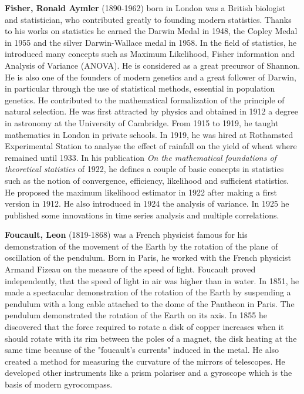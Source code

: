 \textbf{Fisher, Ronald Aymler} (1890-1962) born in London was a British biologist and statistician, who contributed greatly to founding modern statistics. Thanks to his works on statistics he earned the Darwin Medal in 1948, the Copley Medal in 1955 and the silver Darwin-Wallace  medal in 1958. In the field of statistics, he introduced many concepts such as Maximum Likelihood, Fisher information and Analysis of Variance (ANOVA). He is considered as a great precursor of Shannon. He is also one of the founders of modern genetics and a great follower of Darwin, in particular through the use of statistical methods, essential in population genetics. He contributed to the mathematical formalization of the principle of natural selection. He was first attracted by physics and obtained in 1912 a degree in astronomy at the University of Cambridge. From 1915 to 1919, he taught mathematics in London in private schools. In 1919, he was hired at Rothamsted Experimental Station to analyse the effect of rainfall on the yield of wheat where remained until 1933. In his publication \textit{On the mathematical foundations of theoretical statistics} of 1922, he defines a couple of basic concepts in statistics such as the notion of convergence, efficiency, likelihood and sufficient statistics. He proposed the maximum likelihood estimator in 1922 after making a first version in 1912. He also introduced in 1924 the analysis of variance. In 1925 he published some innovations in time series analysis and multiple correlations.

\textbf{Foucault, Leon} (1819-1868) was a French physicist famous for his demonstration of the movement of the Earth by the rotation of the plane of oscillation of the pendulum. Born in Paris, he worked with the French physicist Armand Fizeau on the measure of the speed of light. Foucault proved independently, that the speed of light in air was higher than in water. In 1851, he made a spectacular demonstration of the rotation of the Earth by suspending a pendulum with a long cable attached to the dome of the Pantheon in Paris. The pendulum demonstrated the rotation of the Earth on its axis. In 1855 he discovered that the force required to rotate a disk of copper increases when it should rotate with its rim between the poles of a magnet, the disk heating at the same time because of the "foucault's currents" induced in the metal. He also created a method for measuring the curvature of the mirrors of telescopes. He developed other instruments like a prism polariser and a gyroscope which is the basis of modern gyrocompass.

